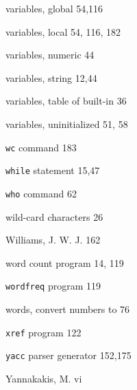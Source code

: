 \begin{multicols}{3}
\hangindent=3pc  variables, global 54,116

\hangindent=3pc  variables, local 54, 116, 182

\hangindent=3pc  variables, numeric 44

\hangindent=3pc  variables, string 12,44

\hangindent=3pc  variables, table of built-in 36

\hangindent=3pc  variables, uninitialized 51, 58

\hangindent=3pc  \verb'wc' command 183

\hangindent=3pc  \verb'while' statement 15,47

\hangindent=3pc  \verb'who' command 62

\hangindent=3pc  wild-card characters 26

\hangindent=3pc  Williams, J. W. J. 162

\hangindent=3pc  word count program 14, 119

\hangindent=3pc  \verb'wordfreq' program 119

\hangindent=3pc  words, convert numbers to 76

\hangindent=3pc  \verb'xref' program 122

\hangindent=3pc  \verb'yacc' parser generator 152,175

\hangindent=3pc  Yannakakis, M. vi

\end{multicols}
